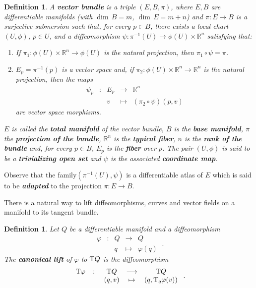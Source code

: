 \documentclass[12pt]{report}
\newtheorem{definition}[teor]{Definition}
\def\ben{\begin{enumerate}}
\def\een{\end{enumerate}}
\def\Real{\mathbb{R}}
\def\Tan{{\rm T}}
\begin{document}
\begin{appendix}
\begin{definition}
A \textbf{vector bundle} is a triple $(E,B,\pi)$,
where $E,B$ are differentiable manifolds
(with $\dim\, B=m$, $\dim\, E=m+n$) and $\pi\colon E\to B$
is a surjective submersion such that, for every $p\in B$,
there exists a local chart $(U,\phi)$, $p\in U$, and a diffeomorphism
$\psi\colon\pi^{-1}(U)\to \phi(U)\times\Real^n$
satisfying that: 
\ben
\item
If $\pi_1\colon\phi(U)\times\Real^n\to\phi(U)$
is the natural projection, then $\pi_1\circ\psi=\pi$.
\item
$E_p=\pi^{-1}(p)$ is a vector space and,
if $\pi_2\colon\phi(U)\times\Real^n\to\Real^n$
is the natural projection, then the maps
$$
\begin{array}{ccccc}
\psi_p & \colon & E_p & \longrightarrow & \Real^n \\
 & & v &\mapsto & (\pi_2\circ\psi)(p,v)
\end{array}
$$
are vector space morphisms.
\een
$E$ is called the \textbf{total manifold} of the vector bundle,
$B$ is the \textbf{base manifold}, $\pi$ the \textbf{projection of the bundle}, 
$\Real^n$ is the \textbf{typical fiber},
$n$ is the \textbf{rank of the bundle} and, for every $ p\in B$,
$E_p$ is the \textbf{fiber} over $p$.
The pair $(U,\phi)$ is said to be a \textbf{trivializing open set}
and $\psi$ is the associated \textbf{coordinate map}.
\end{definition}

Observe that the family$(\pi^{-1}(U),\psi)$ is a differentiable atlas of $E$ which is said to be {\sl \textbf{adapted}} to the projection $\pi:E\to B$.

There is a natural way to lift diffeomorphisms, curves and vector fields
 on a manifold to its tangent bundle.

\begin{definition}
Let $Q$ be a differentiable manifold and a diffeomorphism
$$
\begin{array}{ccccc}
\varphi&\colon&Q&\longrightarrow&Q
\\
& & q & \mapsto & \varphi(q)
\end{array} \ .
$$
The \textbf{canonical lift} of $\varphi$ to $\Tan Q$
is the diffeomorphism
$$
\begin{array}{ccccc}
\Tan\varphi&\colon&\Tan Q&\longrightarrow&\Tan Q
\\
& &(q,v ) & \mapsto & (q,\Tan_q\varphi (v))
\end{array} \ .
$$
\end{definition}


\end{appendix}
\end{document}
